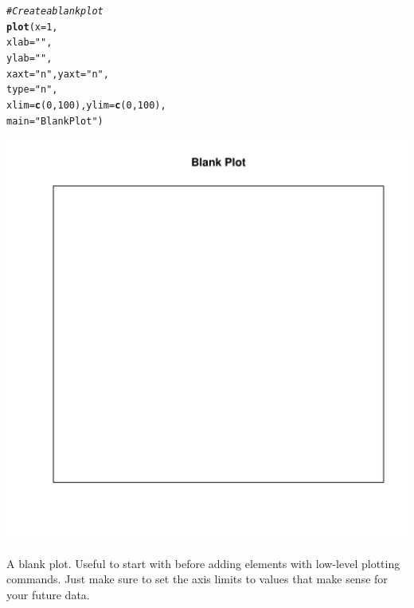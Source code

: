 \documentclass{tufte-book}\usepackage[]{graphicx}\usepackage[]{color}
\makeatletter
\def\maxwidth{ %
  \ifdim\Gin@nat@width>\linewidth
    \linewidth
  \else
    \Gin@nat@width
  \fi
}
\newcommand{\hlnum}[1]{\textcolor[rgb]{0.686,0.059,0.569}{#1}}%
\newcommand{\hlstr}[1]{\textcolor[rgb]{0.192,0.494,0.8}{#1}}%
\newcommand{\hlcom}[1]{\textcolor[rgb]{0.678,0.584,0.686}{\textit{#1}}}%
\newcommand{\hlstd}[1]{\textcolor[rgb]{0.345,0.345,0.345}{#1}}%
\newcommand{\hlkwc}[1]{\textcolor[rgb]{0.333,0.667,0.333}{#1}}%
\newcommand{\hlkwd}[1]{\textcolor[rgb]{0.737,0.353,0.396}{\textbf{#1}}}%
\newenvironment{kframe}{%
 \def\at@end@of@kframe{}%
 \ifinner\ifhmode%
  \def\at@end@of@kframe{\end{minipage}}%
  \begin{minipage}{\columnwidth}%
 \fi\fi%
 \def\FrameCommand##1{\hskip\@totalleftmargin \hskip-\fboxsep
 \colorbox{shadecolor}{##1}\hskip-\fboxsep
     \hskip-\linewidth \hskip-\@totalleftmargin \hskip\columnwidth}%
 \MakeFramed {\advance\hsize-\width
   \@totalleftmargin\z@ \linewidth\hsize
   \@setminipage}}%
 {\par\unskip\endMakeFramed%
 \at@end@of@kframe}
\newenvironment{knitrout}{}{} %
\makeatother
\begin{document}
\begin{marginfigure}
\begin{tiny}
\begin{knitrout}
\color{fgcolor}\begin{kframe}
\begin{alltt}
\hlcom{# Create a blank plot}
\hlkwd{plot}\hlstd{(}\hlkwc{x} \hlstd{=} \hlnum{1}\hlstd{,}
     \hlkwc{xlab} \hlstd{=} \hlstr{""}\hlstd{,}
     \hlkwc{ylab} \hlstd{=} \hlstr{""}\hlstd{,}
     \hlkwc{xaxt} \hlstd{=} \hlstr{"n"}\hlstd{,} \hlkwc{yaxt} \hlstd{=} \hlstr{"n"}\hlstd{,}
     \hlkwc{type} \hlstd{=} \hlstr{"n"}\hlstd{,}
     \hlkwc{xlim} \hlstd{=} \hlkwd{c}\hlstd{(}\hlnum{0}\hlstd{,} \hlnum{100}\hlstd{),} \hlkwc{ylim} \hlstd{=} \hlkwd{c}\hlstd{(}\hlnum{0}\hlstd{,} \hlnum{100}\hlstd{),}
     \hlkwc{main} \hlstd{=} \hlstr{"Blank Plot"}\hlstd{)}
\end{alltt}
\end{kframe}
\includegraphics[width=\maxwidth]{figure/unnamed-chunk-204-1} 

\end{knitrout}
\end{tiny}
\caption{A blank plot. Useful to start with before adding elements with low-level plotting commands. Just make sure to set the axis limits to values that make sense for your future data.}
\label{fig:blankplot}
\end{marginfigure}
\end{document}
